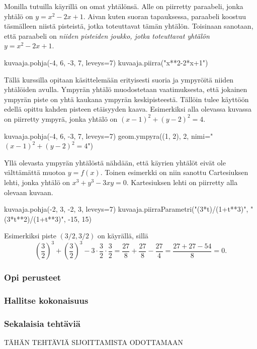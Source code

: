 Monilla tutuilla käyrillä on omat yhtälönsä.
Alle on piirretty paraabeli, jonka yhtälö on $y=x^2-2x+1$.
Aivan kuten suoran tapauksessa, paraabeli koostuu täsmälleen niistä pisteistä, jotka toteuttavat tämän yhtälön.
Toisinaan sanotaan, että paraabeli on \emph{niiden pisteiden joukko, jotka toteuttavat yhtälön $y=x^2-2x+1$}.


\begin{kuva}
	kuvaaja.pohja(-4, 6, -3, 7, leveys=7)
	kuvaaja.piirra("x**2-2*x+1")
\end{kuva}

Tällä kurssilla opitaan käsittelemään erityisesti suoria ja ympyröitä niiden yhtälöiden avulla.
Ympyrän yhtälö muodostetaan vaatimuksesta, että jokainen ympyrän piste on yhtä kaukana ympyrän keskipisteestä.
Tällöin tulee käyttöön edellä opittu kahden pisteen etäisyyden kaava.
Esimerkiksi alla olevassa kuvassa on piirretty ympyrä, jonka yhtälö on $(x-1)^2+(y-2)^2=4$.

\begin{kuva}
	kuvaaja.pohja(-4, 6, -3, 7, leveys=7)
	geom.ympyra((1, 2), 2, nimi="$(x-1)^2+(y-2)^2=4$")
\end{kuva}

Yllä olevasta ympyrän yhtälöstä nähdään, että käyrien yhtälöt eivät ole välttämättä muotoa $y=f(x)$.
Toinen esimerkki on niin sanottu Cartesiuksen lehti, jonka yhtälö on $x^3+y^3-3xy=0$.
Kartesiuksen lehti on piirretty alla olevaan kuvaan.

\begin{kuva}
	kuvaaja.pohja(-2, 3, -2, 3, leveys=7)
	kuvaaja.piirraParametri("(3*t)/(1+t**3)", "(3*t**2)/(1+t**3)", -15, 15)
\end{kuva}


Esimerkiksi piste $(3/2, 3/2)$ on käyrällä, sillä
\[
\left(\frac{3}{2}\right)^3+\left(\frac{3}{2}\right)^3-3\cdot\frac{3}{2}\cdot\frac{3}{2}
=\frac{27}{8}+\frac{27}{8}-\frac{27}{4}=\frac{27+27-54}{8}=0.
\]

\begin{tehtavasivu}

\subsubsection*{Opi perusteet}

\subsubsection*{Hallitse kokonaisuus}

\subsubsection*{Sekalaisia tehtäviä}

TÄHÄN TEHTÄVIÄ SIJOITTAMISTA ODOTTAMAAN

\end{tehtavasivu}